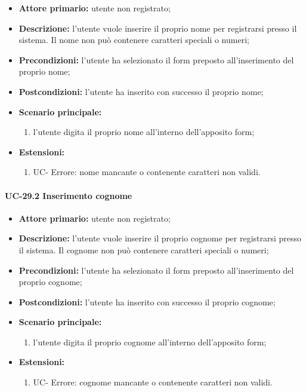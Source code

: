 	\begin{itemize}
		\item \textbf{Attore primario:} utente non registrato;

		\item \textbf{Descrizione:} l'utente vuole inserire il proprio nome per registrarsi presso il sistema. Il nome non può contenere caratteri speciali o numeri;

		\item \textbf{Precondizioni:} l'utente ha selezionato il form preposto all'inserimento del proprio nome;

		\item \textbf{Postcondizioni:} l'utente ha inserito con successo il proprio nome;

		\item \textbf{Scenario principale:}
	  	  \begin{enumerate}
		  	\item l'utente digita il proprio nome all'interno dell'apposito form;
	      \end{enumerate}
		\item \textbf{Estensioni:}
	      \begin{enumerate}
		      \item UC- Errore: nome mancante o contenente caratteri non validi.
	      \end{enumerate}
	\end{itemize}

\paragraph{UC-29.2 Inserimento cognome}

	\begin{itemize}
		\item \textbf{Attore primario:} utente non registrato;

		\item \textbf{Descrizione:} l'utente vuole inserire il proprio cognome per registrarsi presso il sistema. Il cognome non può contenere caratteri speciali o numeri;

		\item \textbf{Precondizioni:} l'utente ha selezionato il form preposto all'inserimento del proprio cognome;

		\item \textbf{Postcondizioni:} l'utente ha inserito con successo il proprio cognome;

		\item \textbf{Scenario principale:}
			\begin{enumerate}
		  		\item l'utente digita il proprio cognome all'interno dell'apposito form;
	  		\end{enumerate}
		\item \textbf{Estensioni:}
	  		\begin{enumerate}
		  		\item UC- Errore: cognome mancante o contenente caratteri non validi.
	  		\end{enumerate}
	\end{itemize}

